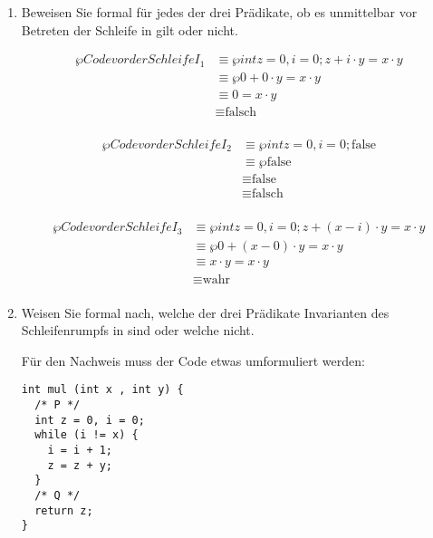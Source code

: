 \documentclass{lehramt-informatik-aufgabe}
\begin{document}
\begin{enumerate}



\item Beweisen Sie formal für jedes der drei Prädikate, ob es
unmittelbar vor Betreten der Schleife in  gilt oder nicht.

\begin{antwort}
\begin{align*}
\wp{Code vor der Schleife}{I_1}
& \equiv \wp{int z = 0, i = 0;}{z + i \cdot y = x \cdot y} \\
& \equiv \wp{}{0 + 0 \cdot y = x \cdot y} \\
& \equiv 0 = x \cdot y \\
& \equiv \text{falsch} \\
\end{align*}

\begin{align*}
\wp{Code vor der Schleife}{I_2}
& \equiv \wp{int z = 0, i = 0;}{\text{false}} \\
& \equiv \wp{}{\text{false}} \\
& \equiv \text{false} \\
& \equiv \text{falsch} \\
\end{align*}

\begin{align*}
\wp{Code vor der Schleife}{I_3}
& \equiv \wp{int z = 0, i = 0;}{z + (x - i) \cdot y = x \cdot y} \\
& \equiv \wp{}{0 + (x - 0) \cdot y = x \cdot y} \\
& \equiv x \cdot y = x \cdot y \\
& \equiv \text{wahr} \\
\end{align*}
\end{antwort}


\item Weisen Sie formal nach, welche der drei Prädikate Invarianten des
Schleifenrumpfs in  sind oder welche nicht.

\begin{antwort}
Für den Nachweis muss der Code etwas umformuliert werden:

\begin{verbatim}
int mul (int x , int y) {
  /* P */
  int z = 0, i = 0;
  while (i != x) {
    i = i + 1;
    z = z + y;
  }
  /* Q */
  return z;
}
\end{verbatim}


\end{antwort}
\end{enumerate}
\end{document}
